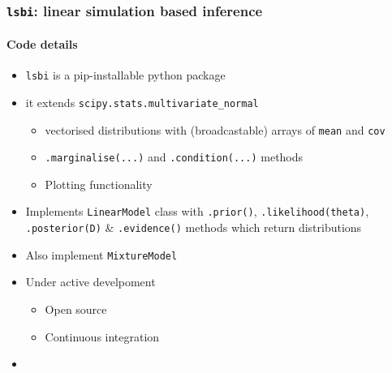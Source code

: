\documentclass[aspectratio=169]{beamer}
\begin{document}
\begin{frame}
    \frametitle{\texttt{lsbi}: linear simulation based inference}
    \framesubtitle{Code details}
    \begin{itemize}
        \item \texttt{lsbi} is a pip-installable python package
        \item it extends \texttt{scipy.stats.multivariate\_normal}
            \begin{itemize}
                \item vectorised distributions with (broadcastable) arrays of \texttt{mean} and \texttt{cov}
                \item \texttt{.marginalise(...)} and \texttt{.condition(...)} methods
                \item Plotting functionality
            \end{itemize}
        \item Implements \texttt{LinearModel} class with \texttt{.prior()}, \texttt{.likelihood(theta)}, \texttt{.posterior(D)} \& \texttt{.evidence()} methods which return distributions
        \item Also implement \texttt{MixtureModel}
        \item Under active develpoment
            \begin{itemize}
                \item Open source
                \item Continuous integration
            \end{itemize}
        \item {}
    \end{itemize}
\end{frame}
\end{document}
